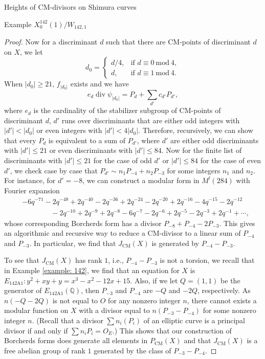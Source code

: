 \documentclass{amsart}
\theoremstyle{definition}
\def\Q{\mathbb Q}
\def\mod{\  \mathrm{mod}\ }
\def\CM{\mathrm{CM}}
\def\div{\operatorname{div}}
\begin{document}
\begin{section}{Heights of CM-divisors on Shimura curves}
\begin{subsection}{Example $X_0^{142}(1)/W_{142,1}$}
\begin{proof}
  Now for a discriminant $d$ such that there are CM-points of
  discriminant $d$ on $X$, we let
  $$
    d_0=\begin{cases}
    d/4, &\text{if }d\equiv 0\mod 4,\\
    d, &\text{if }d\equiv 1\mod 4. \end{cases}
  $$
  When $|d_0|\ge 21$, $f_{|d_0|}$ exists and we have
  $$
    e_d\div\psi_{|d_0|}=P_d+\sum_{d'}c_{d'} P_{d'},
  $$
  where $e_d$ is the cardinality of the stabilizer subgroup of
  CM-points of discriminant $d$,  $d'$ runs over discriminants that
  are either odd integers with $|d'|<|d_0|$ or even integers with
  $|d'|<4|d_0|$. Therefore, recursively, we can show that every $P_d$
  is equivalent to a sum of $P_{d'}$, where $d'$ are either odd
  discriminants with $|d'|\le 21$ or even discriminants with $|d'|\le
  84$. Now for the finite list of discriminants with $|d'|\le 21$ for
  the case of odd $d'$ or $|d'|\le 84$ for the case of even $d'$, we
  check case by case that $P_{d'}\sim n_1P_{-4}+n_2P_{-3}$ for some
  integers $n_1$ and $n_2$. For instance, for $d'=-8$, we can
  construct a modular form in $M^!(284)$
  with Fourier expansion
  \begin{equation*}
  \begin{split}
   &-6q^{-71}-2q^{-48}+2q^{-40}-2q^{-36}+2q^{-24}-2q^{-20}+2q^{-16}
    -4q^{-15}-2q^{-12} \\ 
   &\qquad\qquad-2q^{-10}+2q^{-9}+2q^{-8}-6q^{-7}-2q^{-6}+2q^{-5}-2q^{-3}+2q^{-1}+\cdots,
  \end{split}
  \end{equation*}
  whose corresponding Borcherds form has a divisor $P_{-8}+P_{-4}-2P_{-3}$.
  This gives an algorithmic and recursive way to reduce a CM-divisor
  to a linear sum of $P_{-4}$ and $P_{-3}$. In particular, we find
  that $J_\CM(X)$ is generated by $P_{-4}-P_{-3}$.
  
  To see that $J_\CM(X)$ has rank $1$, i.e., $P_{-4}-P_{-3}$ is not a
  torsion, we recall that in Example \ref{example: 142}, we find that
  an equation for $X$ is $E_{\text{142A1}}:y^2+xy+y=x^3-x^2-12x+15$. Also, if we let
  $Q=(1,1)$ be the generator of $E_{\text{142A1}}(\Q)$, then
  $P_{-3}$ and $P_{-4}$ are $-Q$ and $-2Q$, respectively. As $n(-Q-2Q)$
  is not equal to $O$ for any nonzero integer $n$, there cannot exists a
  modular function on $X$ with a divisor equal to $n(P_{-3}-P_{-4})$ for some
  nonzero integer $n$. (Recall that a divisor $\sum n_i(P_i)$ of an
  elliptic curve is a principal divisor if and only if $\sum
  n_iP_i=O_E$.) This shows that our construction of Borcherds
  forms does generate all elements in $P_\CM(X)$ and that $J_\CM(X)$
  is a free abelian group of rank $1$ generated by the class of
  $P_{-3}-P_{-4}$.
\end{proof}


\end{subsection}
\end{section}
\end{document}
